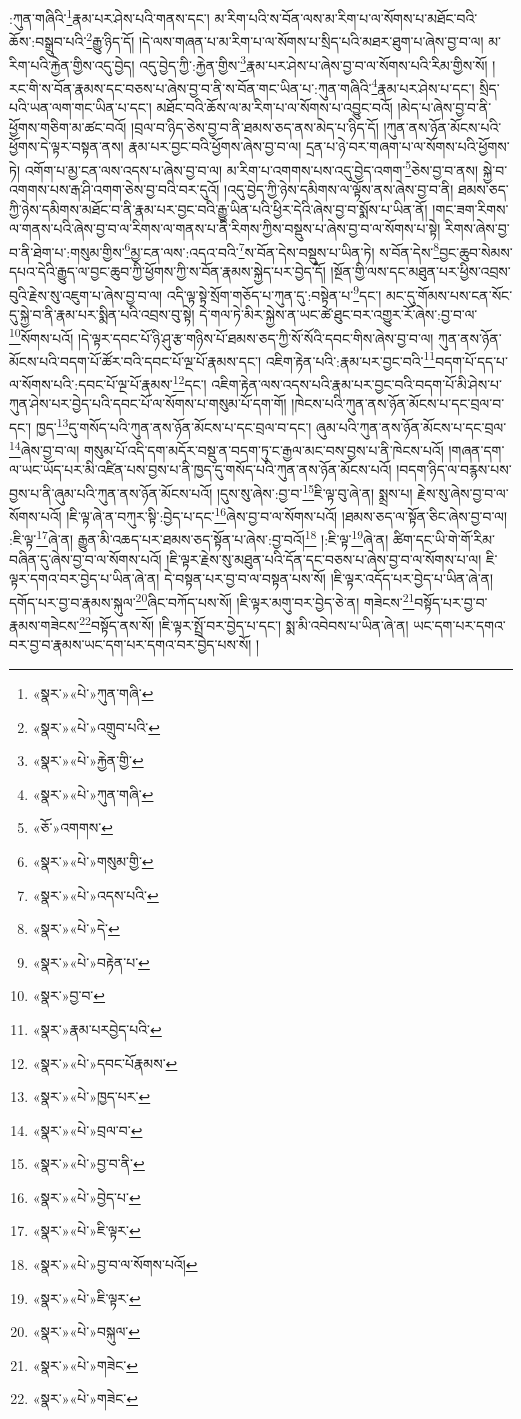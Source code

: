 :ཀུན་གཞིའི་\footnote{«སྣར་»«པེ་»ཀུན་གཞི་}རྣམ་པར་ཤེས་པའི་གནས་དང་། མ་རིག་པའི་ས་བོན་ལས་མ་རིག་པ་ལ་སོགས་པ་མཐོང་བའི་ཆོས་:བསྒྲུབ་པའི་\footnote{«སྣར་»«པེ་»འགྲུབ་པའི་}རྒྱུ་ཉིད་དོ། །དེ་ལས་གཞན་པ་མ་རིག་པ་ལ་སོགས་པ་སྲིད་པའི་མཐར་ཐུག་པ་ཞེས་བྱ་བ་ལ། མ་རིག་པའི་རྐྱེན་གྱིས་འདུ་བྱེད། འདུ་བྱེད་ཀྱི་:རྐྱེན་གྱིས་\footnote{«སྣར་»«པེ་»རྐྱེན་གྱི་}རྣམ་པར་ཤེས་པ་ཞེས་བྱ་བ་ལ་སོགས་པའི་རིམ་གྱིས་སོ། །རང་གི་ས་བོན་རྣམས་དང་བཅས་པ་ཞེས་བྱ་བ་ནི་ས་བོན་གང་ཡིན་པ་:ཀུན་གཞིའི་\footnote{«སྣར་»«པེ་»ཀུན་གཞི་}རྣམ་པར་ཤེས་པ་དང་། སྲིད་པའི་ཡན་ལག་གང་ཡིན་པ་དང་། མཐོང་བའི་ཆོས་ལ་མ་རིག་པ་ལ་སོགས་པ་འབྱུང་བའོ། །མེད་པ་ཞེས་བྱ་བ་ནི་ཕྱོགས་གཅིག་མ་ཚང་བའོ། །བྲལ་བ་ཉིད་ཅེས་བྱ་བ་ནི་ཐམས་ཅད་ནས་མེད་པ་ཉིད་དོ། །ཀུན་ནས་ཉོན་མོངས་པའི་ཕྱོགས་དེ་ལྟར་བསྟན་ནས། རྣམ་པར་བྱང་བའི་ཕྱོགས་ཞེས་བྱ་བ་ལ། དྲན་པ་ཉེ་བར་གཞག་པ་ལ་སོགས་པའི་ཕྱོགས་ཏེ། འགོག་པ་མྱ་ངན་ལས་འདས་པ་ཞེས་བྱ་བ་ལ། མ་རིག་པ་འགགས་པས་འདུ་བྱེད་འགག་\footnote{«ཅོ་»འགགས་}ཅེས་བྱ་བ་ནས། སྐྱེ་བ་འགགས་པས་རྒ་ཤི་འགག་ཅེས་བྱ་བའི་བར་དུའོ། །འདུ་བྱེད་ཀྱི་ཉེས་དམིགས་ལ་ལྟོས་ནས་ཞེས་བྱ་བ་ནི། ཐམས་ཅད་ཀྱི་ཉེས་དམིགས་མཐོང་བ་ནི་རྣམ་པར་བྱང་བའི་རྒྱུ་ཡིན་པའི་ཕྱིར་དེའི་ཞེས་བྱ་བ་སྨོས་པ་ཡིན་ནོ། །གང་ཟག་རིགས་ལ་གནས་པའི་ཞེས་བྱ་བ་ལ་རིགས་ལ་གནས་པ་ནི་རིགས་ཀྱིས་བསྡུས་པ་ཞེས་བྱ་བ་ལ་སོགས་པ་སྟེ། རིགས་ཞེས་བྱ་བ་ནི་ཐེག་པ་:གསུམ་གྱིས་\footnote{«སྣར་»«པེ་»གསུམ་གྱི་}མྱ་ངན་ལས་:འདའ་བའི་\footnote{«སྣར་»«པེ་»འདས་པའི་}ས་བོན་དེས་བསྡུས་པ་ཡིན་ཏེ། ས་བོན་དེས་\footnote{«སྣར་»«པེ་»དེ་}བྱང་ཆུབ་སེམས་དཔའ་དེའི་རྒྱུད་ལ་བྱང་ཆུབ་ཀྱི་ཕྱོགས་ཀྱི་ས་བོན་རྣམས་སྐྱེད་པར་བྱེད་དོ། །སྔོན་གྱི་ལས་དང་མཐུན་པར་ཕྱིས་འབྲས་བུའི་རྗེས་སུ་འཇུག་པ་ཞེས་བྱ་བ་ལ། འདི་ལྟ་སྟེ་སྲོག་གཅོད་པ་ཀུན་དུ་:བསྟེན་པ་\footnote{«སྣར་»«པེ་»བརྟེན་པ་}དང་། མང་དུ་གོམས་པས་ངན་སོང་དུ་སྐྱེ་བ་ནི་རྣམ་པར་སྨིན་པའི་འབྲས་བུ་སྟེ། དེ་གལ་ཏེ་མིར་སྐྱེས་ན་ཡང་ཚེ་ཐུང་བར་འགྱུར་རོ་ཞེས་:བྱ་བ་ལ་\footnote{«སྣར་»བྱ་བ་}སོགས་པའོ། །དེ་ལྟར་དབང་པོ་ཉི་ཤུ་རྩ་གཉིས་པོ་ཐམས་ཅད་ཀྱི་སོ་སོའི་དབང་གིས་ཞེས་བྱ་བ་ལ། ཀུན་ནས་ཉོན་མོངས་པའི་བདག་པོ་ཚོར་བའི་དབང་པོ་ལྔ་པོ་རྣམས་དང་། འཇིག་རྟེན་པའི་:རྣམ་པར་བྱང་བའི་\footnote{«སྣར་»རྣམ་པརབྱེད་པའི་}བདག་པོ་དད་པ་ལ་སོགས་པའི་:དབང་པོ་ལྔ་པོ་རྣམས་\footnote{«སྣར་»«པེ་»དབང་པོརྣམས་}དང་། འཇིག་རྟེན་ལས་འདས་པའི་རྣམ་པར་བྱང་བའི་བདག་པོ་མི་ཤེས་པ་ཀུན་ཤེས་པར་བྱེད་པའི་དབང་པོ་ལ་སོགས་པ་གསུམ་པོ་དག་གོ། །ཁེངས་པའི་ཀུན་ནས་ཉོན་མོངས་པ་དང་བྲལ་བ་དང་། ཁྱད་\footnote{«སྣར་»«པེ་»ཁྱད་པར་}དུ་གསོད་པའི་ཀུན་ནས་ཉོན་མོངས་པ་དང་བྲལ་བ་དང་། ཞུམ་པའི་ཀུན་ནས་ཉོན་མོངས་པ་དང་བྲལ་\footnote{«སྣར་»«པེ་»བྲལ་བ་}ཞེས་བྱ་བ་ལ། གསུམ་པོ་འདི་དག་མདོར་བསྡུ་ན་བདག་ཏུ་ང་རྒྱལ་མང་བས་བྱས་པ་ནི་ཁེངས་པའོ། །གཞན་དག་ལ་ཡང་ཡོད་པར་མི་འཛིན་པས་བྱས་པ་ནི་ཁྱད་དུ་གསོད་པའི་ཀུན་ནས་ཉོན་མོངས་པའོ། །བདག་ཉིད་ལ་བརྙས་པས་བྱས་པ་ནི་ཞུམ་པའི་ཀུན་ནས་ཉོན་མོངས་པའོ། །དུས་སུ་ཞེས་:བྱ་བ་\footnote{«སྣར་»«པེ་»བྱ་བ་ནི་}ཇི་ལྟ་བུ་ཞེ་ན། སྨྲས་པ། རྗེས་སུ་ཞེས་བྱ་བ་ལ་སོགས་པའོ། །ཇི་ལྟ་ཞེ་ན་བཀུར་སྟི་:བྱེད་པ་དང་\footnote{«སྣར་»«པེ་»བྱེད་པ་}ཞེས་བྱ་བ་ལ་སོགས་པའོ། །ཐམས་ཅད་ལ་སྟོན་ཅིང་ཞེས་བྱ་བ་ལ། :ཇི་ལྟ་\footnote{«སྣར་»«པེ་»ཇི་ལྟར་}ཞེ་ན། རྒྱུན་མི་འཆད་པར་ཐམས་ཅད་སྟོན་པ་ཞེས་:བྱ་བའོ།\footnote{«སྣར་»«པེ་»བྱ་བ་ལ་སོགས་པའོ།} །:ཇི་ལྟ་\footnote{«སྣར་»«པེ་»ཇི་ལྟར་}ཞེ་ན། ཚིག་དང་ཡི་གེ་གོ་རིམ་བཞིན་དུ་ཞེས་བྱ་བ་ལ་སོགས་པའོ། །ཇི་ལྟར་རྗེས་སུ་མཐུན་པའི་དོན་དང་བཅས་པ་ཞེས་བྱ་བ་ལ་སོགས་པ་ལ། ཇི་ལྟར་དགའ་བར་བྱེད་པ་ཡིན་ཞེ་ན། དེ་བསྟན་པར་བྱ་བ་ལ་བསྟན་པས་སོ། །ཇི་ལྟར་འདོད་པར་བྱེད་པ་ཡིན་ཞེ་ན། དགོད་པར་བྱ་བ་རྣམས་སྐུལ་\footnote{«སྣར་»«པེ་»བསྐུལ་}ཞིང་བཀོད་པས་སོ། །ཇི་ལྟར་མགུ་བར་བྱེད་ཅེ་ན། གཟེངས་\footnote{«སྣར་»«པེ་»གཟེང་}བསྟོད་པར་བྱ་བ་རྣམས་གཟེངས་\footnote{«སྣར་»«པེ་»གཟེང་}བསྟོད་ནས་སོ། །ཇི་ལྟར་སྤྲོ་བར་བྱེད་པ་དང་། སྨ་མི་འབེབས་པ་ཡིན་ཞེ་ན། ཡང་དག་པར་དགའ་བར་བྱ་བ་རྣམས་ཡང་དག་པར་དགའ་བར་བྱེད་པས་སོ། །
